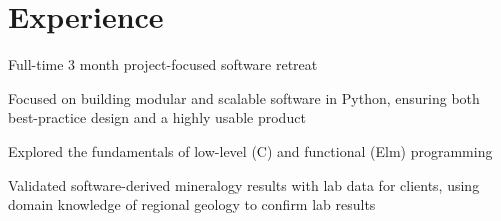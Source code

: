 \documentclass[letterpaper]{deedy-resume} %
\begin{document}
\hfill
%
%
\begin{minipage}[t]{0.66\textwidth} %


\section{Experience}


\vspace{\topsep} %
\begin{tightitemize}
\item Full-time 3 month project-focused software retreat
\item Focused on building modular and scalable software in Python, ensuring both best-practice design and a highly usable product
\item Explored the fundamentals of low-level (C) and functional (Elm) programming 
\end{tightitemize}

\sectionspace %



\begin{tightitemize}
\item Validated software-derived mineralogy results with lab data for clients, using domain knowledge of regional geology to confirm lab results
\end{tightitemize}


\end{minipage}
\end{document}
